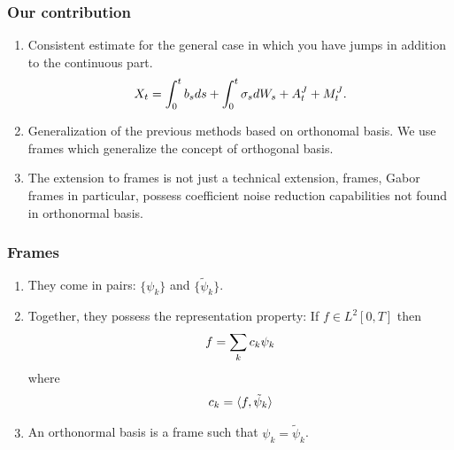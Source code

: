 \documentclass[fleqn]{beamer}
\begin{document}
\begin{frame}
  \frametitle{Our contribution}
  \begin{enumerate}
    \item Consistent estimate for the general case in which you have jumps in addition to the continuous part. 
    \begin{align}
        X_t = \int^t_0 b_s d s + \int^t_0 \sigma_s d W_s + A_t^J + M_t^J. \notag
    \label{}
  \end{align}
    \item Generalization of the previous methods based on orthonomal basis. We use frames which generalize the concept of orthogonal basis.
    \item The extension to frames is not just a technical extension, frames, Gabor frames in particular, possess coefficient noise reduction capabilities not found in orthonormal basis.  
  \end{enumerate}
\end{frame}
\begin{frame}
  \frametitle{Frames}
  \begin{enumerate}
    \item They come in pairs: $\{\psi_k\}$ and $\{\tilde{\psi}_k\}$.
    \item Together, they possess the representation property: If $f \in L^2[0,T]$ then
      \begin{align}
        f = \sum_k c_k  \psi_k \notag
        \label{}
      \end{align}
      where
      \begin{align}
        c_k = \langle f, \tilde{\psi}_k\rangle \notag
        \label{}
      \end{align}
    \item An orthonormal basis is a frame such that $\psi_k = \tilde{\psi}_k$.
  \end{enumerate}
\end{frame}
\end{document}
